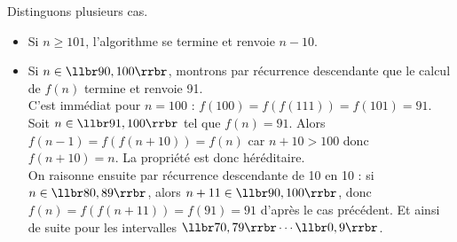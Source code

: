 \ifprof
\begin{corrige}

Distinguons plusieurs cas.

\begin{itemize}
\item Si $n\geq 101$, l'algorithme se termine et renvoie $n-10$. 
\item Si $n\in\llbr90, 100\rrbr$, montrons par récurrence descendante que le calcul de $f(n)$ termine et renvoie 
91.\\
C'est immédiat pour $n=100$ : $f(100)=f(f(111))=f(101)=91$.\\
Soit $n\in\llbr91,100\rrbr$ tel que $f(n)=91$. Alors $f(n-1)=f(f(n+10))=f(n)$ car $n+10>100$ donc $f(n+10)=n$. La 
propriété est 
donc héréditaire.\\
On raisonne ensuite par récurrence descendante de 10 en 10 : si $n\in\llbr80,89\rrbr$, alors $n+11\in\llbr90,100\rrbr$, 
donc $f(n)=f(f(n+11))=f(91)=91$ d'après le cas précédent. Et ainsi de suite pour les intervalles 
$\llbr70,79\rrbr\cdots\llbr0,9\rrbr$.
\end{itemize}
\end{corrige}


\else
\fi






